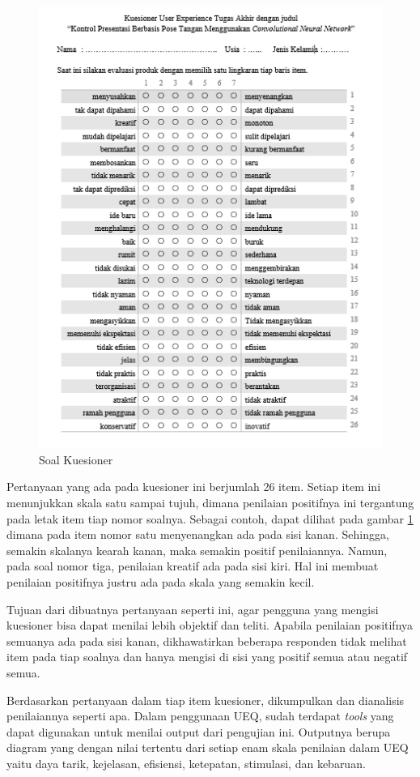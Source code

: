 \begin{figure}[!htb]
  \centering
  \includegraphics[scale=1.5]{gambar/pengujian-user-experience/soal-kuesioner.png}
  \caption{Soal Kuesioner}
  \label{fig:Soal Kuesioner}
\end{figure}

Pertanyaan yang ada pada kuesioner ini berjumlah 26 item. Setiap item ini menunjukkan skala satu sampai tujuh, dimana penilaian positifnya ini tergantung pada letak item tiap nomor soalnya. Sebagai contoh, dapat dilihat pada gambar \ref{fig:Soal Kuesioner} dimana pada item nomor satu menyenangkan ada pada sisi kanan. Sehingga, semakin skalanya kearah kanan, maka semakin positif penilaiannya. Namun, pada soal nomor tiga, penilaian kreatif ada pada sisi kiri. Hal ini membuat penilaian positifnya justru ada pada skala yang semakin kecil. 

Tujuan dari dibuatnya pertanyaan seperti ini, agar pengguna yang mengisi kuesioner bisa dapat menilai lebih objektif dan teliti. Apabila penilaian positifnya semuanya ada pada sisi kanan, dikhawatirkan beberapa responden tidak melihat item pada tiap soalnya dan hanya mengisi di sisi yang positif semua atau negatif semua.  

Berdasarkan pertanyaan dalam tiap item kuesioner, dikumpulkan dan dianalisis penilaiannya seperti apa. Dalam penggunaan UEQ, sudah terdapat \emph{tools} yang dapat digunakan untuk menilai output dari pengujian ini. Outputnya berupa diagram yang dengan nilai tertentu dari setiap enam skala penilaian dalam UEQ yaitu daya tarik, kejelasan, efisiensi, ketepatan, stimulasi, dan kebaruan.


